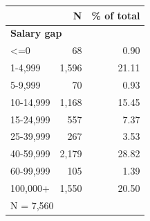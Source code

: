 \begin{tabular}{lrr}


\toprule


 & N & \% of total \\


\midrule


\multicolumn{3}{l}{\textbf{Salary gap}}\\ 
\midrule
<=0                 &          68&        0.90\\
1-4,999             &       1,596&       21.11\\
5-9,999             &          70&        0.93\\
10-14,999           &       1,168&       15.45\\
15-24,999           &         557&        7.37\\
25-39,999           &         267&        3.53\\
40-59,999           &       2,179&       28.82\\
60-99,999           &         105&        1.39\\
100,000+            &       1,550&       20.50\\
\midrule


\multicolumn{3}{l}{\footnotesize N =        7,560}\\


\bottomrule


\end{tabular}


